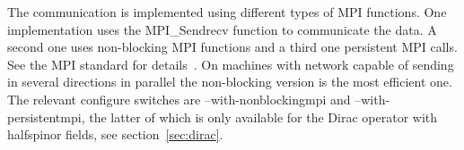 The communication is implemented using different types of MPI
functions. One implementation uses the {\ttfamily MPI\_Sendrecv}
function to communicate the data. A second one uses non-blocking MPI
functions and a third one persistent MPI calls. See the MPI standard
for details~\cite{mpi:web}. On machines with network capable of
sending in several directions in parallel the non-blocking version is
the most efficient one. The relevant configure switches are {\ttfamily
  --with-nonblockingmpi} and {\ttfamily --with-persistentmpi}, the
latter of which is only available for the Dirac operator with
halfspinor fields, see section~\ref{sec:dirac}.


